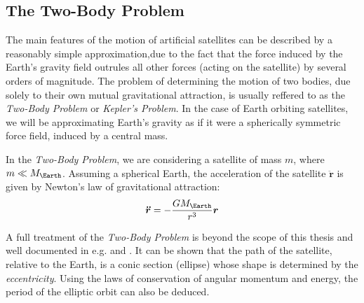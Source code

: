 \subsection{The Two-Body Problem}
\label{ssec:two-body-problem}

The main features of the motion of artificial satellites can be described by a
reasonably simple approximation,due to the fact that the force induced by the 
Earth's gravity field outrules all other forces (acting on the satellite) by 
several orders of magnitude. The problem of determining the motion of two 
bodies, due solely to their own mutual gravitational attraction, is usually 
reffered to as the \emph{Two-Body Problem} or \emph{Kepler's Problem}. In the 
case of Earth orbiting satellites, we will be approximating Earth's gravity as 
if it were a spherically symmetric force field, induced by a central mass.

In the \emph{Two-Body Problem}, we are considering a satellite of mass $m$, 
where $m \ll M_{\Earth}$. Assuming a spherical Earth, the acceleration of the 
satellite $\bm{\ddot{r}}$ is given by Newton's law of gravitational attraction:
\begin{equation}
  \label{eq:mont32}
  \bm{\ddot{r}} = - \frac{G M_{\Earth}}{r^3} \bm{r}
\end{equation}

A full treatment of the \emph{Two-Body Problem} is beyond the scope of this 
thesis and well documented in e.g. \cite{curtisb} and \cite{chobotov}. It can 
be shown that the path of the satellite, relative to the Earth, is a conic section 
(ellipse) whose shape is determined by the \emph{eccentricity}. Using the laws 
of conservation of angular momentum and energy, the period of the elliptic orbit 
can also be deduced.

\iffalse
